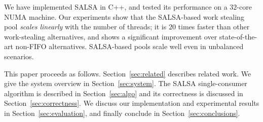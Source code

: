 We have implemented SALSA in C++, and tested its performance on a $32$-core NUMA machine. Our experiments show that the SALSA-based work stealing pool \emph{scales linearly} with the number of threads; it is $20$ times faster than other work-stealing alternatives, and shows a significant improvement over state-of-the-art non-FIFO alternatives. SALSA-based pools scale well even in unbalanced scenarios.

This paper proceeds as follows. Section~\ref{sec:related} describes related work. We give the system overview in Section~\ref{sec:system}. The SALSA single-consumer algorithm is described in Section~\ref{sec:algo} and its correctness is discussed in Section~\ref{sec:correctness}. We discuss our implementation and experimental results in Section~\ref{sec:evaluation}, and finally conclude in Section~\ref{sec:conclusions}.